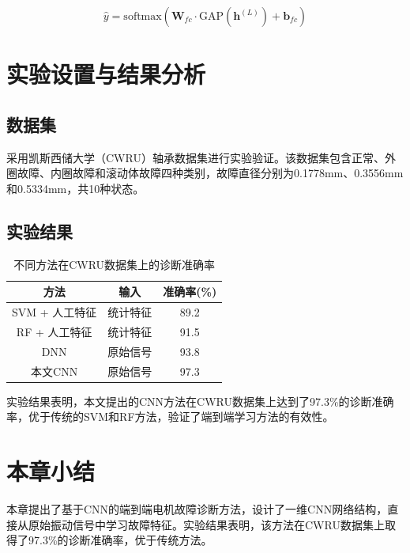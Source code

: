 \begin{equation}
	\hat{y} = \text{softmax}\left(\mathbf{W}_{fc} \cdot \text{GAP}(\mathbf{h}^{(L)}) + \mathbf{b}_{fc}\right)
	\label{eq:classifier}
\end{equation}

\section{实验设置与结果分析}

\subsection{数据集}

采用凯斯西储大学（CWRU）轴承数据集进行实验验证。该数据集包含正常、外圈故障、内圈故障和滚动体故障四种类别，故障直径分别为0.1778mm、0.3556mm和0.5334mm，共10种状态。

\subsection{实验结果}

\begin{table}[htbp]
	\centering
	\caption{不同方法在CWRU数据集上的诊断准确率}
	\label{tab:cnn_results}
	\begin{tabular}{ccc}
		\toprule
		方法 & 输入 & 准确率(\%) \\
		\midrule
		SVM + 人工特征 & 统计特征 & 89.2 \\
		RF + 人工特征 & 统计特征 & 91.5 \\
		DNN & 原始信号 & 93.8 \\
		本文CNN & 原始信号 & 97.3 \\
		\bottomrule
	\end{tabular}
\end{table}

实验结果表明，本文提出的CNN方法在CWRU数据集上达到了97.3\%的诊断准确率，优于传统的SVM和RF方法，验证了端到端学习方法的有效性。

\section{本章小结}

本章提出了基于CNN的端到端电机故障诊断方法，设计了一维CNN网络结构，直接从原始振动信号中学习故障特征。实验结果表明，该方法在CWRU数据集上取得了97.3\%的诊断准确率，优于传统方法。